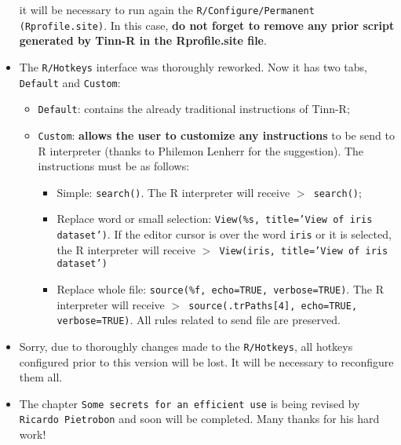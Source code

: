 \begin{itemize}
    it will be necessary to run again the \texttt{R/Configure/Permanent (Rprofile.site)}.
    In this case, \textbf{do not forget to remove any prior script generated by Tinn-R in the Rprofile.site file}.
  \item The \texttt{R/Hotkeys} interface was thoroughly reworked. Now it has two tabs, \texttt{Default} and \texttt{Custom}:
    \begin{itemize}
      \item \texttt{Default}: contains the already traditional instructions of Tinn-R;
      \item \texttt{Custom}: \textbf{allows the user to customize any instructions} to be send to R interpreter
        (thanks to Philemon Lenherr for the suggestion). The instructions must be as follows:
        \begin{itemize}
          \item Simple: \texttt{search()}. The R interpreter will receive \texttt{$>$ search()};
          \item Replace word or small selection: \texttt{View(\%s, title='View of iris dataset')}.
            If the editor cursor is over the word \texttt{iris} or it is selected,
            the R interpreter will receive \texttt{$>$ View(iris, title='View of iris dataset')}
          \item Replace whole file: \texttt{source(\%f, echo=TRUE, verbose=TRUE)}.
            The R interpreter will receive \texttt{$>$ source(.trPaths[4], echo=TRUE, verbose=TRUE)}.
            All rules related to send file are preserved.
        \end{itemize}
    \end{itemize}
  \item Sorry, due to thoroughly changes made to the \texttt{R/Hotkeys}, all hotkeys configured prior to this version will be lost.
    It will be necessary to reconfigure them all.
  \item The chapter \texttt{Some secrets for an efficient use} is being revised by \texttt{Ricardo Pietrobon} and soon will be completed.
    Many thanks for his hard work!
\end{itemize}


